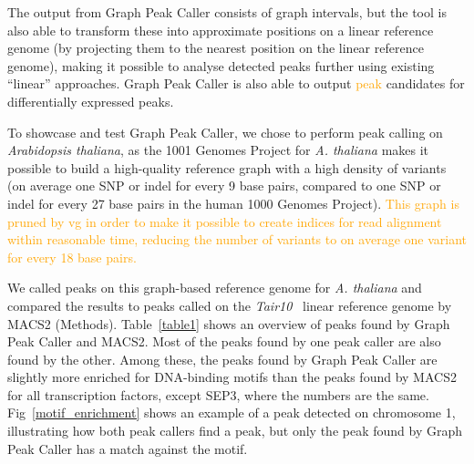 \documentclass[10pt,letterpaper]{article}
\newcommand{\revision}[1]{\textcolor{orange}{#1}}
\begin{document}
The output from Graph Peak Caller consists of graph intervals, but the tool is also able to transform these into approximate positions on a linear reference genome (by projecting them to the nearest position on the linear reference genome), making it possible to analyse detected peaks further using existing “linear” approaches.
Graph Peak Caller is also able to output \revision{peak} candidates for differentially expressed peaks.

To showcase and test Graph Peak Caller, we chose to perform peak calling on \emph{Arabidopsis thaliana}, as the 1001 Genomes Project for \emph{A. thaliana} makes it possible to build a high-quality reference graph with a high density of variants (on average one SNP or indel for every 9 base pairs, compared to one SNP or indel for every 27 base pairs in the human 1000 Genomes Project). \revision{This graph is pruned by vg in order to make it possible to create indices for read alignment within reasonable time, reducing the number of variants to on average one variant for every 18 base pairs.}


We called peaks on this graph-based reference genome for \emph{A. thaliana} and compared the results to peaks called on the \emph{Tair10}~\cite{tair} linear reference genome by MACS2 (Methods).
Table~\ref{table1} shows an overview of peaks found by Graph Peak Caller and MACS2.
Most of the peaks found by one peak caller are also found by the other.
Among these, the peaks found by Graph Peak Caller are slightly more enriched for DNA-binding motifs than the peaks found by MACS2 for all transcription factors, except SEP3, where the numbers are the same.
Fig~\ref{motif_enrichment} shows an example of a peak detected on chromosome 1, illustrating how both peak callers find a peak, but only the peak found by Graph Peak Caller has a match against the motif.
\end{document}
